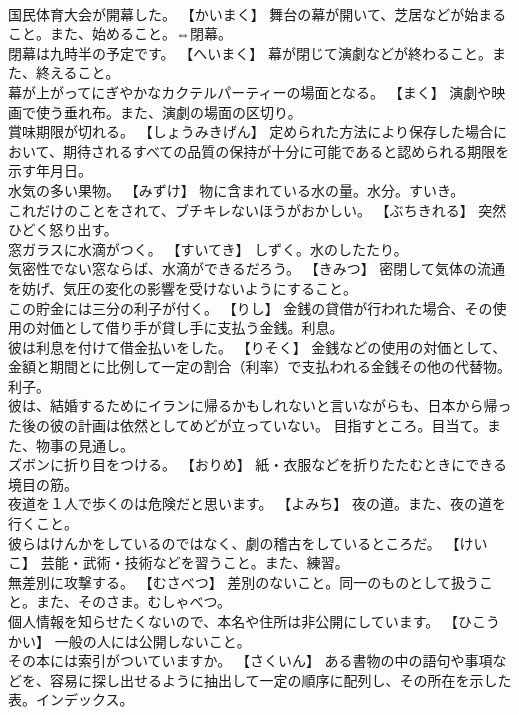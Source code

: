 \documentclass[8pt]{extreport}
\begin{document}
\begin{CJK}{UTF8}{min}
\\	国民体育大会が開幕した。	【かいまく】 舞台の幕が開いて、芝居などが始まること。また、始めること。⇔閉幕。
\\	閉幕は九時半の予定です。	【へいまく】 幕が閉じて演劇などが終わること。また、終えること。
\\	幕が上がってにぎやかなカクテルパーティーの場面となる。	【まく】 演劇や映画で使う垂れ布。また、演劇の場面の区切り。
\\	賞味期限が切れる。	【しょうみきげん】 定められた方法により保存した場合において、期待されるすべての品質の保持が十分に可能であると認められる期限を示す年月日。
\\	水気の多い果物。	【みずけ】 物に含まれている水の量。水分。すいき。
\\	これだけのことをされて、ブチキレないほうがおかしい。	【ぶちきれる】 突然ひどく怒り出す。
\\	窓ガラスに水滴がつく。	【すいてき】 しずく。水のしたたり。
\\	気密性でない窓ならば、水滴ができるだろう。	【きみつ】 密閉して気体の流通を妨げ、気圧の変化の影響を受けないようにすること。
\\	この貯金には三分の利子が付く。	【りし】 金銭の貸借が行われた場合、その使用の対価として借り手が貸し手に支払う金銭。利息。
\\	彼は利息を付けて借金払いをした。	【りそく】 金銭などの使用の対価として、金額と期間とに比例して一定の割合（利率）で支払われる金銭その他の代替物。利子。
\\	彼は、結婚するためにイランに帰るかもしれないと言いながらも、日本から帰った後の彼の計画は依然としてめどが立っていない。	目指すところ。目当て。また、物事の見通し。
\\	ズボンに折り目をつける。	【おりめ】 紙・衣服などを折りたたむときにできる境目の筋。
\\	夜道を１人で歩くのは危険だと思います。	【よみち】 夜の道。また、夜の道を行くこと。
\\	彼らはけんかをしているのではなく、劇の稽古をしているところだ。	【けいこ】 芸能・武術・技術などを習うこと。また、練習。
\\	無差別に攻撃する。	【むさべつ】 差別のないこと。同一のものとして扱うこと。また、そのさま。むしゃべつ。
\\	個人情報を知らせたくないので、本名や住所は非公開にしています。	【ひこうかい】 一般の人には公開しないこと。
\\	その本には索引がついていますか。	【さくいん】 ある書物の中の語句や事項などを、容易に探し出せるように抽出して一定の順序に配列し、その所在を示した表。インデックス。

\end{CJK}
\end{document}
